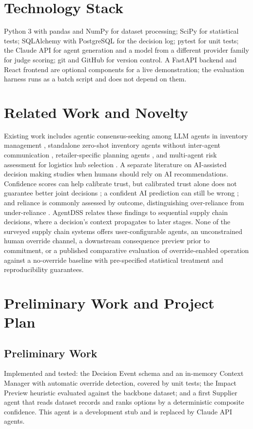 \documentclass[conference]{IEEEtran}
\begin{document}
\section{Technology Stack}
Python 3 with pandas and NumPy for dataset processing; SciPy for statistical tests; SQLAlchemy with PostgreSQL for the decision log; pytest for unit tests; the Claude API for agent generation and a model from a different provider family for judge scoring; git and GitHub for version control. A FastAPI backend and React frontend are optional components for a live demonstration; the evaluation harness runs as a batch script and does not depend on them.

\section{Related Work and Novelty}
Existing work includes agentic consensus-seeking among LLM agents in inventory management \cite{jannelli2024}, standalone zero-shot inventory agents without inter-agent communication \cite{quan2024}, retailer-specific planning agents \cite{jd2025}, and multi-agent risk assessment for logistics hub selection \cite{zhao2026}. A separate literature on AI-assisted decision making studies when humans should rely on AI recommendations. Confidence scores can help calibrate trust, but calibrated trust alone does not guarantee better joint decisions \cite{zhang2020}; a confident AI prediction can still be wrong \cite{whotrust2023}; and reliance is commonly assessed by outcome, distinguishing over-reliance from under-reliance \cite{areyousure2024}. AgentDSS relates these findings to sequential supply chain decisions, where a decision's context propagates to later stages. None of the surveyed supply chain systems offers user-configurable agents, an unconstrained human override channel, a downstream consequence preview prior to commitment, or a published comparative evaluation of override-enabled operation against a no-override baseline with pre-specified statistical treatment and reproducibility guarantees.

\section{Preliminary Work and Project Plan}
\subsection{Preliminary Work}
Implemented and tested: the Decision Event schema and an in-memory Context Manager with automatic override detection, covered by unit tests; the Impact Preview heuristic evaluated against the backbone dataset; and a first Supplier agent that reads dataset records and ranks options by a deterministic composite confidence. This agent is a development stub and is replaced by Claude API agents.
\end{document}
